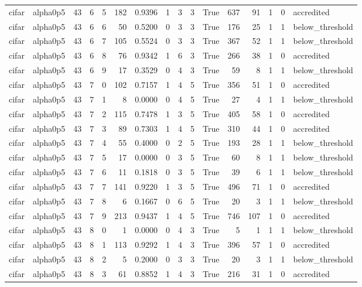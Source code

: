 \begin{tabular}{llrrrrrrrrrrrrrl}
cifar & alpha0p5 & 43 & 6 & 5 & 182 & 0.9396 & 1 & 3 & 3 & True & 637 & 91 & 1 & 0 & accredited \\
cifar & alpha0p5 & 43 & 6 & 6 & 50 & 0.5200 & 0 & 3 & 3 & True & 176 & 25 & 1 & 1 & below\_threshold \\
cifar & alpha0p5 & 43 & 6 & 7 & 105 & 0.5524 & 0 & 3 & 3 & True & 367 & 52 & 1 & 1 & below\_threshold \\
cifar & alpha0p5 & 43 & 6 & 8 & 76 & 0.9342 & 1 & 6 & 3 & True & 266 & 38 & 1 & 0 & accredited \\
cifar & alpha0p5 & 43 & 6 & 9 & 17 & 0.3529 & 0 & 4 & 3 & True & 59 & 8 & 1 & 1 & below\_threshold \\
cifar & alpha0p5 & 43 & 7 & 0 & 102 & 0.7157 & 1 & 4 & 5 & True & 356 & 51 & 1 & 0 & accredited \\
cifar & alpha0p5 & 43 & 7 & 1 & 8 & 0.0000 & 0 & 4 & 5 & True & 27 & 4 & 1 & 1 & below\_threshold \\
cifar & alpha0p5 & 43 & 7 & 2 & 115 & 0.7478 & 1 & 3 & 5 & True & 405 & 58 & 1 & 0 & accredited \\
cifar & alpha0p5 & 43 & 7 & 3 & 89 & 0.7303 & 1 & 4 & 5 & True & 310 & 44 & 1 & 0 & accredited \\
cifar & alpha0p5 & 43 & 7 & 4 & 55 & 0.4000 & 0 & 2 & 5 & True & 193 & 28 & 1 & 1 & below\_threshold \\
cifar & alpha0p5 & 43 & 7 & 5 & 17 & 0.0000 & 0 & 3 & 5 & True & 60 & 8 & 1 & 1 & below\_threshold \\
cifar & alpha0p5 & 43 & 7 & 6 & 11 & 0.1818 & 0 & 3 & 5 & True & 39 & 6 & 1 & 1 & below\_threshold \\
cifar & alpha0p5 & 43 & 7 & 7 & 141 & 0.9220 & 1 & 3 & 5 & True & 496 & 71 & 1 & 0 & accredited \\
cifar & alpha0p5 & 43 & 7 & 8 & 6 & 0.1667 & 0 & 6 & 5 & True & 20 & 3 & 1 & 1 & below\_threshold \\
cifar & alpha0p5 & 43 & 7 & 9 & 213 & 0.9437 & 1 & 4 & 5 & True & 746 & 107 & 1 & 0 & accredited \\
cifar & alpha0p5 & 43 & 8 & 0 & 1 & 0.0000 & 0 & 4 & 3 & True & 5 & 1 & 1 & 1 & below\_threshold \\
cifar & alpha0p5 & 43 & 8 & 1 & 113 & 0.9292 & 1 & 4 & 3 & True & 396 & 57 & 1 & 0 & accredited \\
cifar & alpha0p5 & 43 & 8 & 2 & 5 & 0.2000 & 0 & 3 & 3 & True & 20 & 3 & 1 & 1 & below\_threshold \\
cifar & alpha0p5 & 43 & 8 & 3 & 61 & 0.8852 & 1 & 4 & 3 & True & 216 & 31 & 1 & 0 & accredited \\

\end{tabular}
